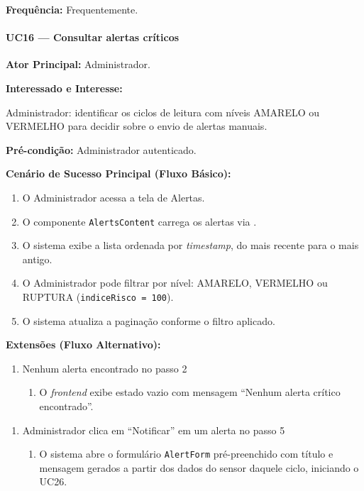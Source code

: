 \textbf{Frequência:} Frequentemente.

\paragraph{UC16 --- Consultar alertas críticos}\hfill\break

\textbf{Ator Principal:} Administrador.

\textbf{Interessado e Interesse:}

Administrador: identificar os ciclos de leitura com níveis
AMARELO ou VERMELHO para decidir sobre o envio de alertas
manuais.

\textbf{Pré-condição:} Administrador autenticado.

\textbf{Cenário de Sucesso Principal (Fluxo Básico):}
\begin{enumerate}
  \item O Administrador acessa a tela de Alertas.
  \item O componente \texttt{AlertsContent} carrega os
        alertas via .
  \item O sistema exibe a lista ordenada por
        \textit{timestamp}, do mais recente para o mais
        antigo.
  \item O Administrador pode filtrar por nível: AMARELO,
        VERMELHO ou RUPTURA (\texttt{indiceRisco = 100}).
  \item O sistema atualiza a paginação conforme o filtro
        aplicado.
\end{enumerate}

\textbf{Extensões (Fluxo Alternativo):}

\begin{enumerate}
  \renewcommand{\theenumi}{2a}
  \renewcommand{\labelenumi}{\theenumi.}
  \item Nenhum alerta encontrado no passo 2
  \begin{enumerate}
  \item O \textit{frontend} exibe estado vazio com
        mensagem ``Nenhum alerta crítico encontrado''.
  \end{enumerate}
\end{enumerate}

\begin{enumerate}
  \renewcommand{\theenumi}{5a}
  \renewcommand{\labelenumi}{\theenumi.}
  \item Administrador clica em ``Notificar'' em um alerta
no passo 5
  \begin{enumerate}
  \item O sistema abre o formulário \texttt{AlertForm}
        pré-preenchido com título e mensagem gerados a
        partir dos dados do sensor daquele ciclo,
        iniciando o UC26.
  \end{enumerate}
\end{enumerate}

